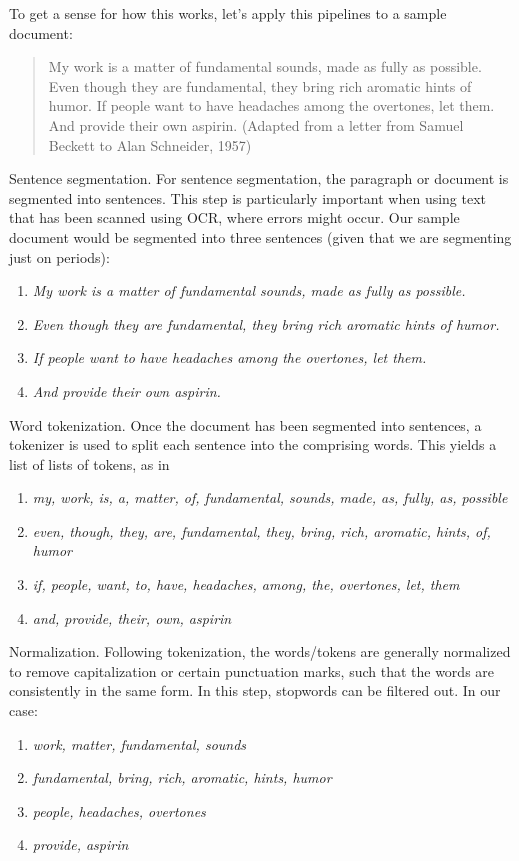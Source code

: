 To get a sense for how this works, let's apply this pipelines to a sample document:

\begin{quote}
My work is a matter of fundamental sounds, made as fully as possible. Even though they are fundamental, they bring rich aromatic hints of humor. If people want to have headaches among the overtones, let them. And provide their own aspirin. (Adapted from a letter from Samuel Beckett to Alan Schneider, 1957)
\end{quote}

Sentence segmentation.  For sentence segmentation, the paragraph or document is segmented into sentences. This step is particularly important when using text that has been scanned using OCR, where errors might occur. Our sample document would be segmented into three sentences (given that we are segmenting just on periods):

\begin{enumerate}
    \item \textit{My work is a matter of fundamental sounds, made as fully as possible.}
    \item \textit{Even though they are fundamental, they bring rich aromatic hints of humor.}
    \item \textit{If people want to have headaches among the overtones, let them.}
    \item \textit{And provide their own aspirin.}
\end{enumerate}

Word tokenization. Once the document has been segmented into sentences, a tokenizer is used to split each sentence into the comprising words. This yields a list of lists of tokens, as in
\begin{enumerate}
    \item \textit{my, work, is, a, matter, of, fundamental, sounds, made, as, fully, as, possible}
    \item \textit{even, though, they, are, fundamental, they, bring, rich, aromatic, hints, of, humor}
    \item \textit{if, people, want, to, have, headaches, among, the, overtones, let, them}
    \item \textit{and, provide, their, own, aspirin}
\end{enumerate}

Normalization. Following tokenization, the words/tokens are generally normalized to remove capitalization or certain punctuation marks, such that the words are consistently in the same form. In this step, stopwords can be filtered out. In our case:
\begin{enumerate}
    \item \textit{work, matter, fundamental, sounds}
    \item \textit{fundamental, bring, rich, aromatic, hints, humor}
    \item \textit{people, headaches, overtones}
    \item \textit{provide, aspirin}
\end{enumerate}

